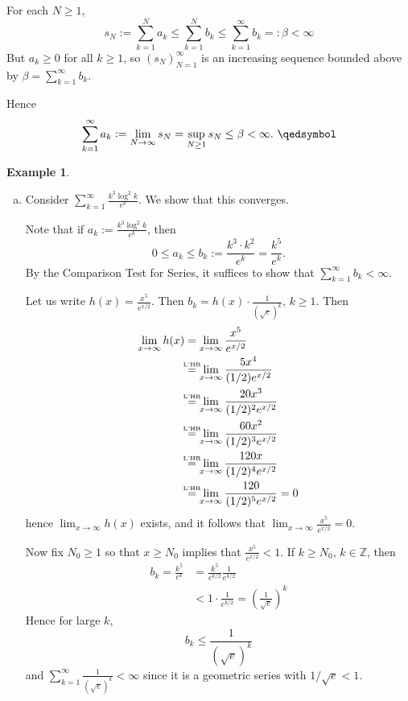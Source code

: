\documentclass[11pt]{article}
\theoremstyle{definition}
\newtheorem{exmp}[thm]{Example}
\newcommand{\mbZ}{\ensuremath{\mathbb{Z}}}
\newcommand{\lhr}{\stackrel{\mathclap{\mbox{\normalfont\tiny L'HR}}}{=}}
\begin{document}
For each $N \geq 1$, 
$$s_N := \sum_{k=1}^N a_k \leq \sum_{k=1}^N b_k \leq \sum_{k=1}^\infty b_k =: \beta < \infty$$
But $a_k \geq 0$ for all $k \geq 1$, so $(s_N)_{N=1}^\infty$ is an increasing sequence bounded above by $\beta = \sum_{k=1}^\infty b_k$. 

Hence
$$\sum_{k=1}^\infty a_k := \lim_{N\to\infty} s_N = \sup_{N\geq1} s_N \leq \beta < \infty. \text{ } \qedsymbol$$

\begin{exmp}~
\begin{enumerate}[(a)] \vspace{-0.2cm}

\item Consider $\sum_{k=1}^\infty \frac{k^3 \log^2 k}{e^k}$. We show that this converges.

Note that if $a_k := \frac{k^3\log^2k}{e^k}$, then
$$0 \leq a_k \leq b_k := \frac{k^3 \cdot k^2}{e^k} = \frac{k^5}{e^k}.$$
By the Comparison Test for Series, it suffices to show that $\sum_{k=1}^\infty b_k < \infty$. 

Let us write $h(x) = \frac{x^5}{e^{x/2}}$. Then $b_k = h(x) \cdot \frac{1}{(\sqrt{e})^k}$, $k \geq 1$. Then
\begin{align*}
\lim_{x\to\infty} h(x) & = \lim_{x\to\infty} \frac{x^5}{e^{x/2}} \\
& \lhr \lim_{x\to\infty} \frac{5x^4}{(1/2)e^{x/2}} \\
& \lhr \lim_{x\to\infty} \frac{20x^3}{(1/2)^2 e^{x/2}} \\
& \lhr \lim_{x\to\infty} \frac{60x^2}{(1/2)^3 e^{x/2}} \\
& \lhr \lim_{x\to\infty} \frac{120x}{(1/2)^4 e^{x/2}} \\
& \lhr \lim_{x\to\infty} \frac{120}{(1/2)^5 e^{x/2}} = 0
\end{align*}
hence $\lim_{x\to\infty} h(x)$ exists, and it follows that
$\lim_{x\to\infty} \frac{x^5}{e^{x/2}} = 0$.

Now fix $N_0 \geq 1$ so that $x \geq N_0$ implies that $\frac{x^5}{e^{x/2}} < 1$. If $k \geq N_0$, $k \in \mbZ$, then
\begin{align*}
b_k = \frac{k^5}{e^k} & = \frac{k^5}{e^{k/2}} \frac{1}{e^{k/2}} \\
& < 1 \cdot \frac{1}{e^{k/2}} = \left(\frac{1}{\sqrt{e}}\right)^k
\end{align*}
Hence for large $k$,
$$b_k \leq \frac{1}{(\sqrt{e})^k}$$
and $\sum_{k=1}^\infty \frac{1}{(\sqrt{e})^k} < \infty$ since it is a geometric series with $1/\sqrt{e} < 1$. 


\end{enumerate}
\end{exmp}
\end{document}

